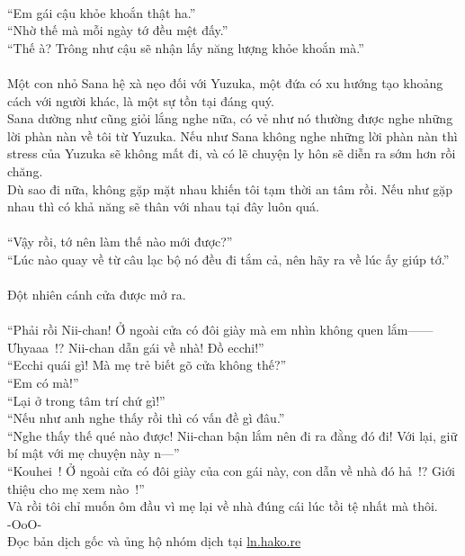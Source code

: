 \documentclass[12pt,a4paper, twosides]{book}
\begin{document}
\\
“Em gái cậu khỏe khoắn thật ha.”\\
“Nhờ thế mà mỗi ngày tớ đều mệt đấy.”\\
“Thế à? Trông như cậu sẽ nhận lấy năng lượng khỏe khoắn mà.”\\
\\
Một con nhỏ Sana hệ xà nẹo đối với Yuzuka, một đứa có xu hướng tạo khoảng cách với người khác, là một sự tồn tại đáng quý.\\
Sana dường như cũng giỏi lắng nghe nữa, có vẻ như nó thường được nghe những lời phàn nàn về tôi từ Yuzuka. Nếu như Sana không nghe những lời phàn nàn thì stress của Yuzuka sẽ không mất đi, và có lẽ chuyện ly hôn sẽ diễn ra sớm hơn rồi chăng.\\
Dù sao đi nữa, không gặp mặt nhau khiến tôi tạm thời an tâm rồi. Nếu như gặp nhau thì có khả năng sẽ thân với nhau tại đây luôn quá.\\
\\
“Vậy rồi, tớ nên làm thế nào mới được?”\\
“Lúc nào quay về từ câu lạc bộ nó đều đi tắm cả, nên hãy ra về lúc ấy giúp tớ.”\\
\\
Đột nhiên cánh cửa được mở ra.\\
\\
“Phải rồi Nii-chan! Ở ngoài cửa có đôi giày mà em nhìn không quen lắm——Ưhyaaa~!? Nii-chan dẫn gái về nhà! Đồ ecchi!”\\
“Ecchi quái gì! Mà mẹ trẻ biết gõ cửa không thế?”\\
“Em có mà!”\\
“Lại ở trong tâm trí chứ gì!”\\
“Nếu như anh nghe thấy rồi thì có vấn đề gì đâu.”\\
“Nghe thấy thế qué nào được! Nii-chan bận lắm nên đi ra đằng đó đi! Với lại, giữ bí mật với mẹ chuyện này n—”\\
“Kouhei~! Ở ngoài cửa có đôi giày của con gái này, con dẫn về nhà đó hả~!? Giới thiệu cho mẹ xem nào~!”\\
Và rồi tôi chỉ muốn ôm đầu vì mẹ lại về nhà đúng cái lúc tồi tệ nhất mà thôi.\\
-OoO-\\
Đọc bản dịch gốc và ủng hộ nhóm dịch tại \href{https://ln.hako.re/}{ln.hako.re}\\
\newpage
\end{document}
